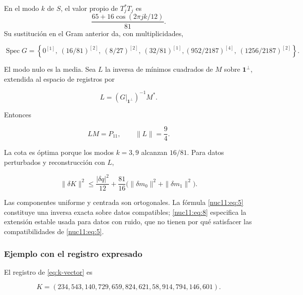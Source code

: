 En el modo \(k\) de \(S\), el valor propio de \(T_j^*T_j\) es
\[
 \frac{65+16\cos(2\pi jk/12)}{81}.
\]
Su sustitución en el Gram anterior da, con multiplicidades,



\begin{equation}
\operatorname{Spec}G=\left\{
0^{[1]},\ (16/81)^{[2]},\ (8/27)^{[2]},\ (32/81)^{[1]},
(952/2187)^{[4]},\ (1256/2187)^{[2]}\right\}.
\label{nuc11:eq:7}
\end{equation}



El modo nulo es la media. Sea \(L\) la inversa de mínimos cuadrados
de \(M\) sobre \(\mathbf1^\perp\), extendida al espacio de
registros por



\[
L=(G|_{\mathbf1^\perp})^{-1}M^*.
\]



Entonces



\begin{equation}
LM=P_{11},\qquad \|L\|=\frac94.
\label{nuc11:eq:8}
\end{equation}



La cota es óptima porque los modos \(k=3,9\) alcanzan \(16/81\).
Para datos perturbados y reconstrucción con \(L\),



\begin{equation}
\|\delta K\|^2\le \frac{|\delta q|^2}{12}
+\frac{81}{16}\bigl(\|\delta m_0\|^2+\|\delta m_1\|^2\bigr).
\label{nuc11:eq:9}
\end{equation}



Las componentes uniforme y centrada son ortogonales. La fórmula \eqref{nuc11:eq:5} constituye una inversa exacta sobre datos compatibles; \eqref{nuc11:eq:8} especifica la extensión estable usada para datos con ruido, que no tienen por qué satisfacer las compatibilidades de \eqref{nuc11:eq:5}.

\subsubsection{Ejemplo con el registro expresado}

El registro de \eqref{eq:k-vector} es



\begin{equation}
K=(234,543,140,729,659,824,621,58,914,794,146,601).
\label{nuc11:eq:10}
\end{equation}



